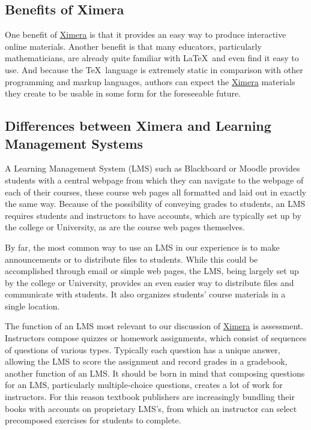 \documentclass{ximera}
\begin{document}
\subsection{Benefits of Ximera}
One benefit of \href{http://ximera.osu.edu}{\sf Ximera}
is that it provides an easy way to produce interactive online materials.
Another benefit is that many educators, particularly mathematicians,
are already quite familiar with \LaTeX\ and
even find it easy to use.
And because the \TeX\ language is extremely static in comparison with
other programming and markup languages, authors can expect
the \href{http://ximera.osu.edu}{\sf Ximera}
materials they create to be usable in some
form for the foreseeable future.

\subsection{Differences between Ximera and Learning Management Systems}
A Learning Management System
(LMS) such as Blackboard or Moodle
provides students with a central webpage from
which they can navigate to the webpage of
each of their courses, these course web pages
all formatted and laid out in exactly the same way.
Because of the possibility of conveying grades
to students, an LMS requires students
and instructors to have accounts,
which are typically set up by
the college or University, as are the course
web pages themselves.

By far, the most common way to use an LMS in our
experience is to make announcements or to distribute
files to students.  While this could be accomplished through email
or simple web pages, the LMS, being
largely set up by the college or University, provides
an even easier way to distribute files and communicate with students.
It also organizes students' course materials in a single location.

The function of an LMS most relevant to our discussion
of \href{http://ximera.osu.edu}{\sf Ximera} is assessment.
Instructors compose quizzes or homework assignments,
which consist of sequences of questions of various types.
Typically each question has a unique answer, allowing
the LMS to score the assignment and record grades in a
gradebook, another function of an LMS.
It should be born in mind that composing questions for
an LMS, particularly multiple-choice questions, creates a lot of work
for instructors. For this reason textbook publishers
are increasingly bundling their books with accounts
on proprietary LMS's, from which an
instructor can select precomposed exercises for students
to complete.
\end{document}
